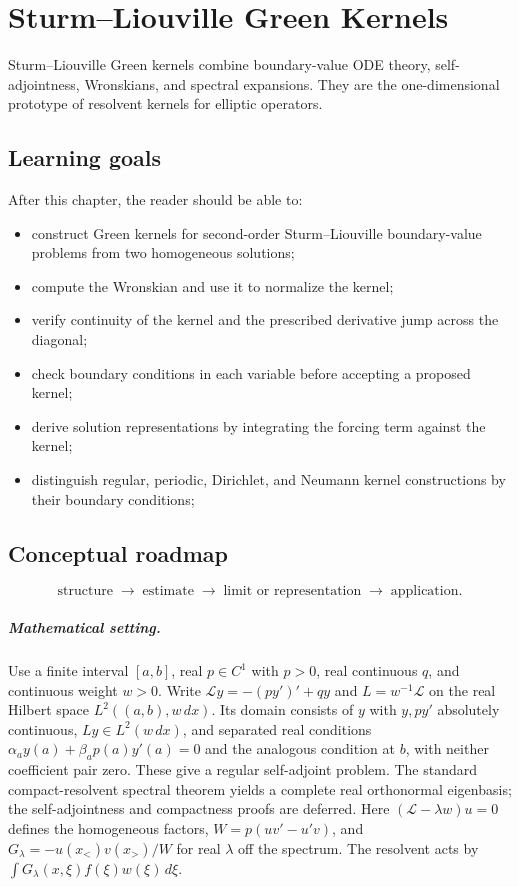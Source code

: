 \chapter{Sturm–Liouville Green Kernels}
\label{ch:iii26}

Sturm--Liouville Green kernels combine boundary-value ODE theory, self-adjointness, Wronskians, and spectral expansions. They are the one-dimensional prototype of resolvent kernels for elliptic operators.

\section*{Learning goals}
After this chapter, the reader should be able to:
\begin{itemize}
\item construct Green kernels for second-order Sturm--Liouville boundary-value problems from two homogeneous solutions;
\item compute the Wronskian and use it to normalize the kernel;
\item verify continuity of the kernel and the prescribed derivative jump across the diagonal;
\item check boundary conditions in each variable before accepting a proposed kernel;
\item derive solution representations by integrating the forcing term against the kernel;
\item distinguish regular, periodic, Dirichlet, and Neumann kernel constructions by their boundary conditions;
\end{itemize}
\section*{Conceptual roadmap}
\[
\boxed{\text{structure}\;\longrightarrow\;\text{estimate}\;\longrightarrow\;\text{limit or representation}\;\longrightarrow\;\text{application}.}
\]

\paragraph{Mathematical setting.}
Use a finite interval $[a,b]$, real $p\in C^1$ with $p>0$, real continuous $q$, and continuous weight $w>0$. Write $\mathcal Ly=-(py')'+qy$ and $L=w^{-1}\mathcal L$ on the real Hilbert space $L^2((a,b),w\,dx)$. Its domain consists of $y$ with $y,py'$ absolutely continuous, $Ly\in L^2(w\,dx)$, and separated real conditions $\alpha_a y(a)+\beta_a p(a)y'(a)=0$ and the analogous condition at $b$, with neither coefficient pair zero. These give a regular self-adjoint problem. The standard compact-resolvent spectral theorem yields a complete real orthonormal eigenbasis; the self-adjointness and compactness proofs are deferred. Here $(\mathcal L-\lambda w)u=0$ defines the homogeneous factors, $W=p(uv'-u' v)$, and $G_\lambda=-u(x_<)v(x_>)/W$ for real $\lambda$ off the spectrum. The resolvent acts by $\int G_\lambda(x,\xi)f(\xi)w(\xi)\,d\xi$.

